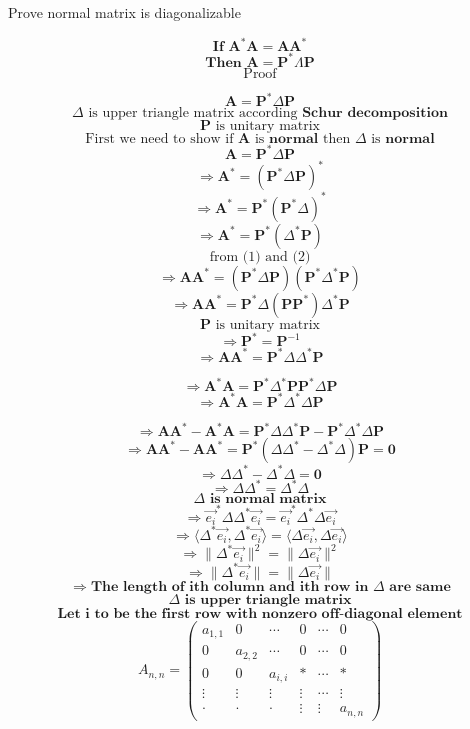\documentclass[10pt]{article}
\begin{document}
Prove normal matrix is diagonalizable

$$\textbf{If }\textbf{A}^\ast\textbf{A}=\textbf{A}\textbf{A}^\ast$$
$$\textbf{Then }\textbf{A}=\textbf{P}^\ast\Lambda\textbf{P}$$
$$\text{Proof}$$

$$\textbf{A} = \textbf{P}^\ast\Delta\textbf{P}$$
$$\Delta\text{ is upper triangle matrix according }\textbf{Schur decomposition}$$ 
$$\textbf{P}\text{ is unitary matrix}$$
$$\text{First we need to show if }\textbf{A}\text{ is }\textbf{normal}\text{ then }\Delta\text{ is }\textbf{normal}$$
$$\textbf{A} = \textbf{P}^\ast\Delta\textbf{P}$$
$$\Rightarrow\textbf{A}^\ast = (\textbf{P}^\ast\Delta\textbf{P})^\ast$$
$$\Rightarrow\textbf{A}^\ast = \textbf{P}^\ast(\textbf{P}^\ast\Delta)^\ast$$
$$\Rightarrow\textbf{A}^\ast = \textbf{P}^\ast(\Delta^\ast\textbf{P})$$
$$\text{from (1) and (2)}$$
$$\Rightarrow\textbf{A}\textbf{A}^\ast = (\textbf{P}^\ast\Delta\textbf{P})(\textbf{P}^\ast\Delta^\ast\textbf{P})$$
$$\Rightarrow\textbf{A}\textbf{A}^\ast = \textbf{P}^\ast\Delta(\textbf{P}\textbf{P}^\ast)\Delta^\ast\textbf{P}$$
$$\textbf{P} \text{ is unitary matrix}$$
$$\Rightarrow\textbf{P}^\ast = \textbf{P}^{-1}$$
$$\Rightarrow\textbf{A}\textbf{A}^\ast = \textbf{P}^\ast\Delta\Delta^\ast\textbf{P}$$

$$\Rightarrow\textbf{A}^\ast\textbf{A} = \textbf{P}^\ast\Delta^\ast\textbf{P}\textbf{P}^\ast\Delta\textbf{P}$$
$$\Rightarrow\textbf{A}^\ast\textbf{A} = \textbf{P}^\ast\Delta^\ast\Delta\textbf{P}$$

$$\Rightarrow\textbf{A}\textbf{A}^\ast - \textbf{A}^\ast\textbf{A} = \textbf{P}^\ast\Delta\Delta^\ast\textbf{P}-\textbf{P}^\ast\Delta^\ast\Delta\textbf{P}$$
$$\Rightarrow\textbf{A}\textbf{A}^\ast - \textbf{A}\textbf{A}^\ast = \textbf{P}^\ast(\Delta\Delta^\ast-\Delta^\ast\Delta)\textbf{P} = \textbf{0}$$
$$\Rightarrow \Delta\Delta^\ast-\Delta^\ast\Delta = \textbf{0}$$
$$\Rightarrow\Delta\Delta^\ast = \Delta^\ast\Delta$$
$$\Delta \textbf{ is normal matrix}$$
$$\Rightarrow\vec{e_i}^\ast\Delta\Delta^\ast\vec{e_i} = \vec{e_i}^\ast\Delta^\ast\Delta\vec{e_i}$$
$$\Rightarrow\langle\Delta^\ast\vec{e_i},\Delta^\ast\vec{e_i}\rangle = \langle\Delta\vec{e_i}, \Delta\vec{e_i}\rangle$$
$$\Rightarrow\lVert\Delta^\ast\vec{e_i}\rVert^{2} = \lVert\Delta\vec{e_i}\lVert^{2}$$
$$\Rightarrow\lVert\Delta^\ast\vec{e_i}\rVert = \rVert\Delta\vec{e_i}\lVert$$
$$\Rightarrow\textbf{The length of ith column and ith row in }\Delta\textbf{ are same} $$
$$\Delta\textbf{ is upper triangle matrix}$$
$$\textbf{Let i to be the first row with nonzero off-diagonal element}$$
$$
A_{n,n} = 
\begin{pmatrix}
a_{1,1}     &     0     & \cdots & 0      & \cdots & 0      \\
   0        & a_{2, 2}  & \cdots & 0      & \cdots & 0      \\
   0        &     0     & a_{i,i}& \ast   & \cdots & \ast   \\
\vdots      &   \vdots  & \vdots & \vdots & \cdots & \vdots \\
   \cdot    &    \cdot  & \cdot  & \vdots & \vdots & a_{n,n}
\end{pmatrix}
$$
\end{document}
